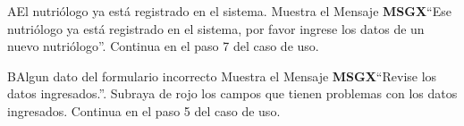 		\begin{UCtrayectoriaA}{A}{El nutriólogo ya está registrado en el sistema.}
			\UCpaso Muestra el Mensaje {\bf MSGX}``Ese nutriólogo ya está registrado en el sistema, por favor ingrese los datos de un nuevo nutriólogo''.
			\UCpaso Continua en el paso 7 del caso de uso.
		\end{UCtrayectoriaA}
		\begin{UCtrayectoriaA}{B}{Algun dato del formulario incorrecto}
			\UCpaso Muestra el Mensaje {\bf MSGX}``Revise los datos ingresados.''.
                \UCpaso Subraya de rojo los campos que tienen problemas con los datos ingresados.
			\UCpaso Continua en el paso 5 del caso de uso.
		\end{UCtrayectoriaA}

